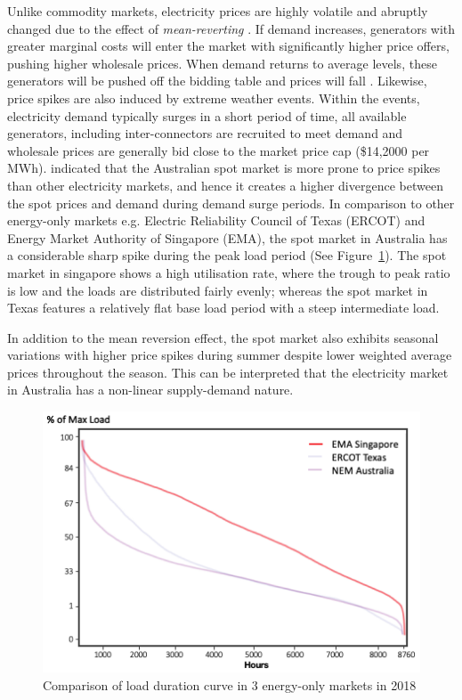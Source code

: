 \documentclass{pasa}%
\begin{document}
Unlike commodity markets, electricity prices are highly volatile and abruptly changed due to the effect of \textit{mean-reverting} \cite{escribano2011}. If demand increases, generators with greater marginal costs will enter the market with significantly higher price offers, pushing higher wholesale prices. When demand returns to average levels, these generators will be pushed off the bidding table and prices will fall \cite{ignatieva2016}. Likewise, price spikes are also induced by extreme weather events. Within the events, electricity demand typically surges in a short period of time, all available generators, including inter-connectors are recruited to  meet demand and  wholesale prices are generally bid close to the market price cap (\$14,2000 per MWh). 
\cite{Higgs2009} indicated that the Australian spot market is more prone to price spikes than other electricity markets, and hence it creates a higher divergence between the spot prices and demand during demand surge periods. In comparison to other energy-only markets e.g. Electric Reliability Council of Texas (ERCOT) and Energy Market Authority of Singapore (EMA), the spot market in Australia has a considerable sharp spike during the peak load period (See Figure~\ref{fig:Fig2-allloadcurve}). The spot market in singapore shows a high utilisation rate, where the trough to peak ratio is low and the loads are distributed fairly evenly; whereas the spot market in Texas features a relatively flat base load period with a steep intermediate load.

In addition to the mean reversion effect, the spot market also exhibits seasonal variations with higher price spikes during summer despite lower weighted average prices throughout the season. This can be interpreted that the electricity market in Australia has a non-linear supply-demand nature.

\begin{figure}
\begin{center}
\includegraphics[width=.7\textwidth,height=.23\textheight,keepaspectratio]{DR/PASA_example/Figures_DR/allload.png}
\caption{Comparison of load duration curve in 3 energy-only markets in 2018}\label{fig:Fig2-allloadcurve}
\end{center}
\end{figure}
\end{document}
